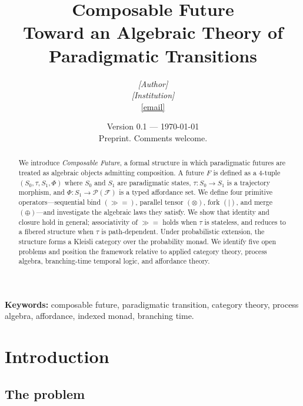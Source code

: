 \documentclass[11pt, a4paper]{article}
\title{%
  \textbf{Composable Future}\\[4pt]
  \large Toward an Algebraic Theory of Paradigmatic Transitions
}
\author{%
  \textit{[Author]}\\[2pt]
  \small \textit{[Institution]}\\
  \small \href{mailto:}{[email]}
}
\date{%
  \small Version 0.1 — \today\\
  \small Preprint. Comments welcome.
}
\theoremstyle{plain}
\theoremstyle{definition}
\theoremstyle{remark}
\newcommand{\bind}{\mathbin{\gg\!=}}          %
\newcommand{\tensor}{\otimes}                  %
\newcommand{\pfork}{\mathbin{|}}               %
\newcommand{\merge}{\oplus}                    %
\newcommand{\Fut}{\mathcal{F}}                 %
\newcommand{\Pow}[1]{\mathcal{P}(#1)}         %
\newcommand{\traj}{\tau}                       %
\newcommand{\aff}{\Phi}                        %
\begin{document}

\maketitle

\begin{abstract}
We introduce \emph{Composable Future}, a formal structure in which paradigmatic
futures are treated as algebraic objects admitting composition.
A future $F$ is defined as a 4-tuple $(S_0, \traj, S_1, \aff)$ where $S_0$
and $S_1$ are paradigmatic states, $\traj\colon S_0 \to S_1$ is a trajectory
morphism, and $\aff\colon S_1 \to \Pow{\Fut}$ is a typed affordance set.
We define four primitive operators---sequential bind $(\bind)$, parallel
tensor $(\tensor)$, fork $(\pfork)$, and merge $(\merge)$---and investigate
the algebraic laws they satisfy.
We show that identity and closure hold in general; associativity of $\bind$
holds when $\traj$ is stateless, and reduces to a fibered structure when
$\traj$ is path-dependent.
Under probabilistic extension, the structure forms a Kleisli category over
the probability monad.
We identify five open problems and position the framework relative to applied
category theory, process algebra, branching-time temporal logic, and
affordance theory.
\end{abstract}

\smallskip
\noindent\textbf{Keywords:}
composable future, paradigmatic transition, category theory, process algebra,
affordance, indexed monad, branching time.

\bigskip

\section{Introduction}
\label{sec:intro}

\subsection{The problem}
%
\end{document}
